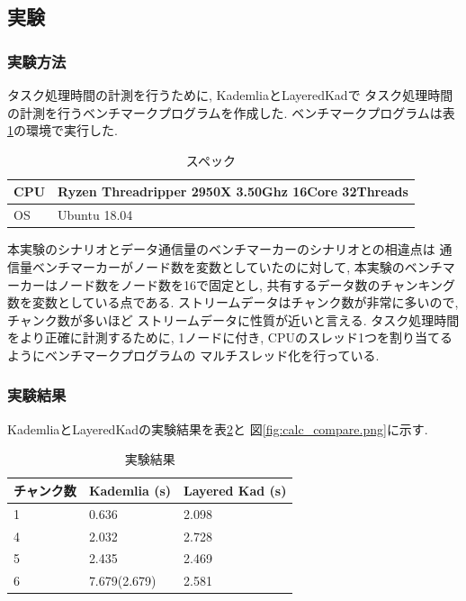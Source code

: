 \documentclass[sotsuron]{jcsie}
\begin{document}
\subsection{実験}
\subsubsection{実験方法}
タスク処理時間の計測を行うために, KademliaとLayeredKadで
タスク処理時間の計測を行うベンチマークプログラムを作成した.
ベンチマークプログラムは表\ref{table:spec-ryzen}の環境で実行した.

\begin{table}[H]
	\caption{スペック}	
	\centering
	\label{table:spec-ryzen}
	\begin{tabular}{|l|l|}
		\hline
		CPU &   
		Ryzen Threadripper 2950X 3.50Ghz 16Core 32Threads \\ 
		\hline	
		OS  &   
		Ubuntu 18.04 \\ 
		\hline
	\end{tabular}	
\end{table}

本実験のシナリオとデータ通信量のベンチマーカーのシナリオとの相違点は
通信量ベンチマーカーがノード数を変数としていたのに対して, 
本実験のベンチマーカーはノード数をノード数を16で固定とし, 
共有するデータ数のチャンキング数を変数としている点である.
ストリームデータはチャンク数が非常に多いので, チャンク数が多いほど
ストリームデータに性質が近いと言える.
タスク処理時間をより正確に計測するために, 
1ノードに付き, CPUのスレッド1つを割り当てるようにベンチマークプログラムの
マルチスレッド化を行っている.

\subsubsection{実験結果}
KademliaとLayeredKadの実験結果を表\ref{table:calc-result}と
図\ref{fig:calc_compare.png}に示す.

\begin{table}[H]
	\caption{実験結果}
	\centering
	\label{table:calc-result}
	\begin{tabular}{|l|l|l|}
		\hline
		チャンク数 &   
		Kademlia (s)    &   
		Layered Kad (s)\\ 
		\hline
		1               &   
		0.636           &   
		2.098\\
		\hline
		4               &   
		2.032           &   
		2.728\\
		\hline
		5               &   
		2.435           &   
		2.469\\
		\hline
		6               &   
		7.679(2.679)    &   
		2.581\\
		\hline
	\end{tabular}
\end{table}
\end{document}

